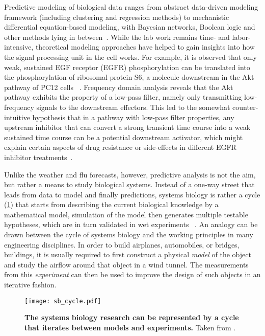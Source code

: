Predictive modeling of biological data ranges from abstract 
data-driven modeling framework (including clustering and 
regression methods) to mechanistic differential 
equation-based modeling, with Bayesian networks, Boolean
logic and other methods lying in between~\citep{deJong2002}. 
While the lab work remains time- and labor-intensive, 
theoretical 
modeling approaches have helped to gain insights into how
the signal processing unit in the cell works.
For example, it is observed that only
weak, sustained EGF receptor (EGFR) phosphorylation can be
translated into the phosphorylation of ribosomal protein 
S6, a molecule downstream in the Akt pathway of PC12 cells~%
\citep{Fujita2010}. Frequency domain analysis reveals that 
the Akt pathway exhibits the property of a low-pass filter,
namely only transmitting low-frequency signals to the 
downstream effectors. This led to the somewhat 
counter-intuitive hypothesis that in a pathway with low-pass filter properties, any upstream inhibitor that can convert a strong transient time course into a weak sustained time course can be a potential downstream activator, which might 
explain certain aspects of drug resistance or side-effects
in different EGFR inhibitor treatments~\citep{Kosaka2011,
Lin2012}.

Unlike the weather and flu forecasts, however, predictive
analysis is not the aim, but rather a means to study 
biological systems. Instead of a one-way street that leads
from data to model and finally predictions, systems biology
is rather a cycle (\ref{fig:sb_cycle}) 
that starts from describing the current
biological knowledge by a mathematical model, simulation of
the model then generates multiple testable hypotheses, which
are in turn validated in wet experiments~%
\citep{Kitano2002e}. An analogy can be drawn between the
cycle of systems biology and the working principles in many
engineering disciplines. In order to build airplanes, 
automobiles, or bridges, buildings, it is usually required
to first construct a physical \emph{model} of the object
and study the airflow around that object in a wind tunnel.
The measurements from this \emph{experiment} can then be 
used to improve the design of such objects in an iterative
fashion.

\begin{figure}[!ht]
\begin{center}
\texttt{[image: sb\_cycle.pdf]}
\end{center}
\caption[Cycle of systems biology]{{\bf The systems biology
research can be represented by a cycle that iterates between
models and experiments.} 
Taken from \cite{Kitano2002e}.
}
\label{fig:sb_cycle}
\end{figure}

